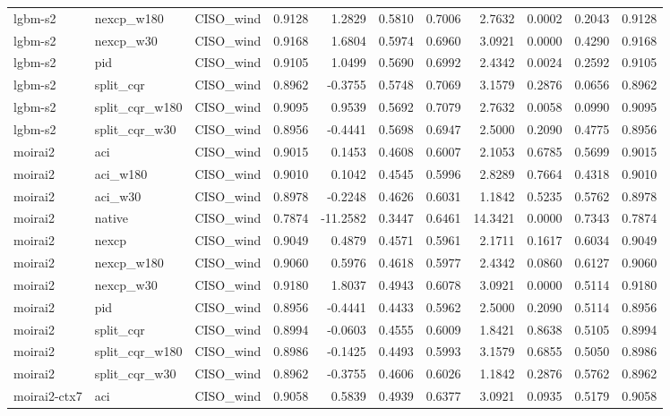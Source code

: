 \begin{tabular}{lllrrrrrrrr}
lgbm-s2 & nexcp_w180 & CISO_wind & 0.9128 & 1.2829 & 0.5810 & 0.7006 & 2.7632 & 0.0002 & 0.2043 & 0.9128 \\
lgbm-s2 & nexcp_w30 & CISO_wind & 0.9168 & 1.6804 & 0.5974 & 0.6960 & 3.0921 & 0.0000 & 0.4290 & 0.9168 \\
lgbm-s2 & pid & CISO_wind & 0.9105 & 1.0499 & 0.5690 & 0.6992 & 2.4342 & 0.0024 & 0.2592 & 0.9105 \\
lgbm-s2 & split_cqr & CISO_wind & 0.8962 & -0.3755 & 0.5748 & 0.7069 & 3.1579 & 0.2876 & 0.0656 & 0.8962 \\
lgbm-s2 & split_cqr_w180 & CISO_wind & 0.9095 & 0.9539 & 0.5692 & 0.7079 & 2.7632 & 0.0058 & 0.0990 & 0.9095 \\
lgbm-s2 & split_cqr_w30 & CISO_wind & 0.8956 & -0.4441 & 0.5698 & 0.6947 & 2.5000 & 0.2090 & 0.4775 & 0.8956 \\
moirai2 & aci & CISO_wind & 0.9015 & 0.1453 & 0.4608 & 0.6007 & 2.1053 & 0.6785 & 0.5699 & 0.9015 \\
moirai2 & aci_w180 & CISO_wind & 0.9010 & 0.1042 & 0.4545 & 0.5996 & 2.8289 & 0.7664 & 0.4318 & 0.9010 \\
moirai2 & aci_w30 & CISO_wind & 0.8978 & -0.2248 & 0.4626 & 0.6031 & 1.1842 & 0.5235 & 0.5762 & 0.8978 \\
moirai2 & native & CISO_wind & 0.7874 & -11.2582 & 0.3447 & 0.6461 & 14.3421 & 0.0000 & 0.7343 & 0.7874 \\
moirai2 & nexcp & CISO_wind & 0.9049 & 0.4879 & 0.4571 & 0.5961 & 2.1711 & 0.1617 & 0.6034 & 0.9049 \\
moirai2 & nexcp_w180 & CISO_wind & 0.9060 & 0.5976 & 0.4618 & 0.5977 & 2.4342 & 0.0860 & 0.6127 & 0.9060 \\
moirai2 & nexcp_w30 & CISO_wind & 0.9180 & 1.8037 & 0.4943 & 0.6078 & 3.0921 & 0.0000 & 0.5114 & 0.9180 \\
moirai2 & pid & CISO_wind & 0.8956 & -0.4441 & 0.4433 & 0.5962 & 2.5000 & 0.2090 & 0.5114 & 0.8956 \\
moirai2 & split_cqr & CISO_wind & 0.8994 & -0.0603 & 0.4555 & 0.6009 & 1.8421 & 0.8638 & 0.5105 & 0.8994 \\
moirai2 & split_cqr_w180 & CISO_wind & 0.8986 & -0.1425 & 0.4493 & 0.5993 & 3.1579 & 0.6855 & 0.5050 & 0.8986 \\
moirai2 & split_cqr_w30 & CISO_wind & 0.8962 & -0.3755 & 0.4606 & 0.6026 & 1.1842 & 0.2876 & 0.5762 & 0.8962 \\
moirai2-ctx7 & aci & CISO_wind & 0.9058 & 0.5839 & 0.4939 & 0.6377 & 3.0921 & 0.0935 & 0.5179 & 0.9058 \\

\end{tabular}
